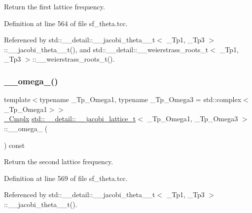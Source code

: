 Return the first lattice frequency. 



Definition at line 564 of file sf\+\_\+theta.\+tcc.



Referenced by std\+::\+\_\+\+\_\+detail\+::\+\_\+\+\_\+jacobi\+\_\+theta\+\_\+\_\+t$<$ \+\_\+\+Tp1, \+\_\+\+Tp3 $>$\+::\+\_\+\+\_\+jacobi\+\_\+theta\+\_\+\_\+t(), and std\+::\+\_\+\+\_\+detail\+::\+\_\+\+\_\+weierstrass\+\_\+roots\+\_\+t$<$ \+\_\+\+Tp1, \+\_\+\+Tp3 $>$\+::\+\_\+\+\_\+weierstrass\+\_\+roots\+\_\+t().

\mbox{\label{structstd_1_1____detail_1_1____jacobi__lattice__t_ae6e3f68ebe7ca4d530ae74d058cd3f23}} 
\subsubsection{\texorpdfstring{\+\_\+\+\_\+omega\+\_()}{\_\_omega\_2()}}
{\footnotesize\ttfamily template$<$typename \+\_\+\+Tp\+\_\+\+Omega1, typename \+\_\+\+Tp\+\_\+\+Omega3 = std\+::complex$<$\+\_\+\+Tp\+\_\+\+Omega1$>$$>$ \\
\hyperlink{structstd_1_1____detail_1_1____jacobi__lattice__t_a77e286c37544d6ba5e4fb5542d3aad5f}{\+\_\+\+Cmplx} \hyperlink{structstd_1_1____detail_1_1____jacobi__lattice__t}{std\+::\+\_\+\+\_\+detail\+::\+\_\+\+\_\+jacobi\+\_\+lattice\+\_\+t}$<$ \+\_\+\+Tp\+\_\+\+Omega1, \+\_\+\+Tp\+\_\+\+Omega3 $>$\+::\+\_\+\+\_\+omega\+\_ (\begin{DoxyParamCaption}{ }\end{DoxyParamCaption}) const\hspace{0.3cm}{\ttfamily [inline]}}



Return the second lattice frequency. 



Definition at line 569 of file sf\+\_\+theta.\+tcc.



Referenced by std\+::\+\_\+\+\_\+detail\+::\+\_\+\+\_\+jacobi\+\_\+theta\+\_\+\_\+t$<$ \+\_\+\+Tp1, \+\_\+\+Tp3 $>$\+::\+\_\+\+\_\+jacobi\+\_\+theta\+\_\+\_\+t().

